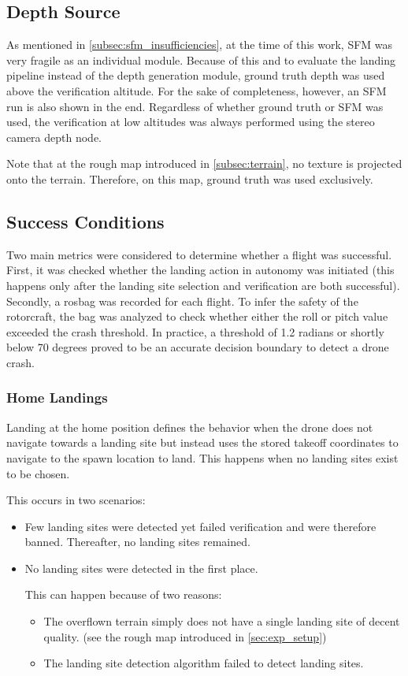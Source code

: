 \subsection{Depth Source}
As mentioned in \cref{subsec:sfm_insufficiencies}, at the time of this work, SFM was very fragile as an individual module. Because of this and to evaluate the landing pipeline instead of the depth generation module, ground truth depth was used above the verification altitude. For the sake of completeness, however, an SFM run is also shown in the end. Regardless of whether ground truth or SFM was used, the verification at low altitudes was always performed using the stereo camera depth node.

Note that at the rough map introduced in \cref{subsec:terrain}, no texture is projected onto the terrain. Therefore, on this map, ground truth was used exclusively.

\subsection{Success Conditions}
Two main metrics were considered to determine whether a flight was successful. First, it was checked whether the landing action in autonomy was initiated (this happens only after the landing site selection and verification are both successful).
Secondly, a rosbag was recorded for each flight. To infer the safety of the rotorcraft, the bag was analyzed to check whether either the roll or pitch value exceeded the crash threshold. In practice, a threshold of 1.2 radians or shortly below 70 degrees proved to be an accurate decision boundary to detect a drone crash.

\subsubsection{Home Landings}
Landing at the home position defines the behavior when the drone does not navigate towards a landing site but instead uses the stored takeoff coordinates to navigate to the spawn location to land. This happens when no landing sites exist to be chosen.

This occurs in two scenarios:
\begin{itemize}
    \item Few landing sites were detected yet failed verification and were therefore banned. Thereafter, no landing sites remained.
    \item No landing sites were detected in the first place. 

    This can happen because of two reasons:
    \begin{itemize}
        \item The overflown terrain simply does not have a single landing site of decent quality. (see the rough map introduced in \cref{sec:exp_setup})
        \item The landing site detection algorithm failed to detect landing sites.
    \end{itemize}
\end{itemize}
    

